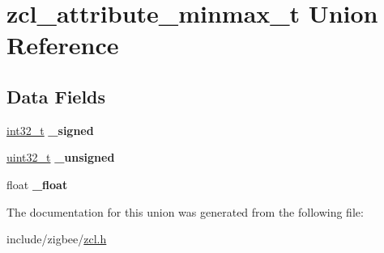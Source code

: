 \hypertarget{unionzcl__attribute__minmax__t}{\section{zcl\-\_\-attribute\-\_\-minmax\-\_\-t Union Reference}
\label{unionzcl__attribute__minmax__t}
}
\subsection*{Data Fields}
\begin{DoxyCompactItemize}
\item 
\hypertarget{group__zcl_gaf6243ea4edbb271f4a04dbd17bd4e1ec}{\hyperlink{group__hal_gafd12020da5a235dfcf0c3c748fb5baed}{int32\-\_\-t} {\bfseries \-\_\-signed}}\label{group__zcl_gaf6243ea4edbb271f4a04dbd17bd4e1ec}

\item 
\hypertarget{group__zcl_ga39d687d8e7bab88e70fd8f84213c18ab}{\hyperlink{group__hal__dos_ga09a1e304d66d35dd47daffee9731edaa}{uint32\-\_\-t} {\bfseries \-\_\-unsigned}}\label{group__zcl_ga39d687d8e7bab88e70fd8f84213c18ab}

\item 
\hypertarget{group__zcl_ga552109c4aeafc45875faff0313ae8202}{float {\bfseries \-\_\-float}}\label{group__zcl_ga552109c4aeafc45875faff0313ae8202}

\end{DoxyCompactItemize}


The documentation for this union was generated from the following file\-:\begin{DoxyCompactItemize}
\item 
include/zigbee/\hyperlink{zcl_8h}{zcl.\-h}\end{DoxyCompactItemize}
